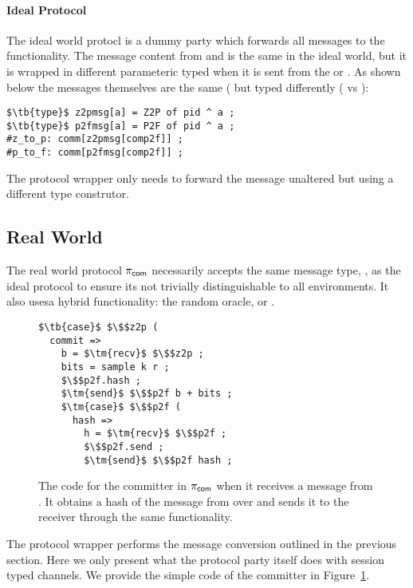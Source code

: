\paragraph{Ideal Protocol}
The ideal world protocl is a dummy party which forwards all messages to the functionality. 
The message content from  and  is the same in the ideal world, but it is wrapped in different parameteric typed when it is sent from the  or .
As shown below the messages themselves are the same ( but typed differently ( vs ):
\begin{lstlisting}[basicstyle=\small\BeraMonottFamily, frame=single, mathescape]
$\tb{type}$ z2pmsg[a] = Z2P of pid ^ a ;
$\tb{type}$ p2fmsg[a] = P2F of pid ^ a ;
#z_to_p: comm[z2pmsg[comp2f]] ;
#p_to_f: comm[p2fmsg[comp2f]] ;
\end{lstlisting}
The protocol wrapper only needs to forward the message unaltered but using a different type construtor. 

\subsection{Real World}
The real world protocol $\pi_{{\mathsf {com}}}$ necessarily accepts the same message type, , as the ideal protocol to ensure its not trivially distinguishable to all environments. 
It also usesa hybrid functionality: the random oracle, or \Fro.

\begin{figure}
\begin{lstlisting}[basicstyle=\small\BeraMonottFamily, frame=single, mathescape]
$\tb{case}$ $\$$z2p (
  commit => 
    b = $\tm{recv}$ $\$$z2p ;
    bits = sample k r ;
    $\$$p2f.hash ;
    $\tm{send}$ $\$$p2f b + bits ;
    $\tm{case}$ $\$$p2f (
      hash => 
        h = $\tm{recv}$ $\$$p2f ;
        $\$$p2f.send ;
        $\tm{send}$ $\$$p2f hash ;
\end{lstlisting}
\caption{The code for the committer in $\pi_{{\mathsf {com}}}$ when it receives a  message from \Z. It obtains a hash of the message from \Fro over  and sends it to the receiver through the same functionality.}
\label{lst:committer}
\end{figure}

The protocol wrapper performs the message conversion outlined in the previous section. Here we only present what the protocol party itself does with session typed channels. 
We provide the simple code of the committer in Figure~\ref{lst:committer}.

